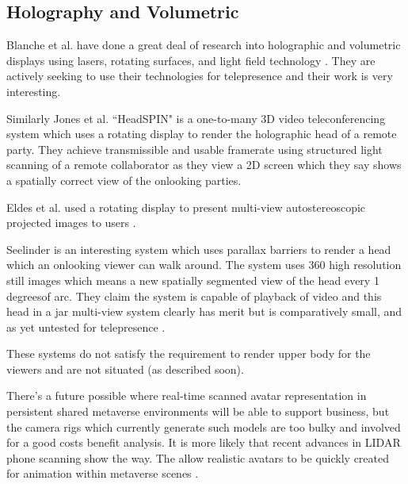 \subsection{Holography and Volumetric}
Blanche et al. have done a great deal of research into holographic and volumetric displays using lasers, rotating surfaces, and light field technology   \cite{Blanche2010,Tay2008}. They are actively seeking to use their technologies for telepresence and their work is very interesting.\par
Similarly Jones et al. ``HeadSPIN" is a one-to-many 3D video teleconferencing system \cite{Jones2009} which uses a rotating display to render the holographic head of a remote party. They achieve transmissible and usable framerate using structured light scanning of a remote collaborator as they view a 2D screen which they say shows a spatially correct view of the onlooking parties.\par
Eldes et al. used a rotating display to present multi-view autostereoscopic projected images to users \cite{Eldes2013}.\par
Seelinder is an interesting system which uses parallax barriers to render a head which an onlooking viewer can walk around. The system uses 360 high resolution still images which means a new spatially segmented view of the head every 1 degreesof arc. They claim the system is capable of playback of video and this head in a jar multi-view system clearly has merit but is comparatively small, and as yet untested for telepresence \cite{Yendo2010}.\par
These systems do not satisfy the requirement to render upper body for the viewers and are not situated (as described soon).\par
There's a future possible where real-time scanned avatar representation in persistent shared metaverse environments will be able to support business, but the camera rigs which currently generate such models are too bulky and involved for a good costs benefit analysis. It is more likely that recent advances in LIDAR phone scanning show the way. The allow realistic avatars to be quickly created for animation within metaverse scenes \cite{authenticVolume2022}.
